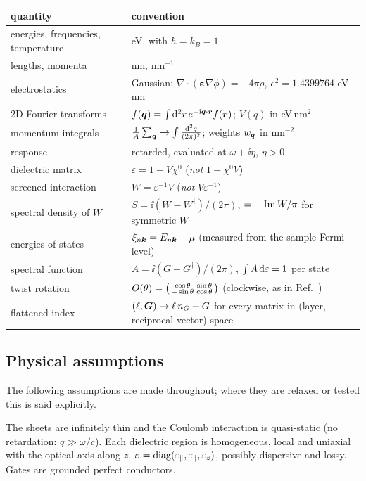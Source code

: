 \begin{center}
\begin{tabularx}{\textwidth}{lX}
\toprule
quantity & convention\\
\midrule
energies, frequencies, temperature & eV, with $\hbar=k_B=1$ \\
lengths, momenta & nm, nm$^{-1}$\\
electrostatics & Gaussian: $\nabla\cdot(\bm\varepsilon\nabla\phi)=-4\pi\rho$, $e^2=1.4399764$ eV\,nm\\
2D Fourier transforms & $f(\bm q)=\int\mathrm d^2r\,e^{-\mathrm i\bm q\cdot\bm r}f(\bm r)$; $V(q)$ in eV\,nm$^2$\\
momentum integrals & $\frac1A\sum_{\bm q}\to\int\frac{\mathrm d^2q}{(2\pi)^2}$; weights $w_{\bm q}$ in nm$^{-2}$\\
response & retarded, evaluated at $\omega+\ii\eta$, $\eta>0$\\
dielectric matrix & $\varepsilon=1-V\chi^0$ \quad(\emph{not} $1-\chi^0V$)\\
screened interaction & $W=\varepsilon^{-1}V$ \quad(\emph{not} $V\varepsilon^{-1}$)\\
spectral density of $W$ & $S=\ii(W-W^\dagger)/(2\pi)$, $=-\operatorname{Im} W/\pi$ for symmetric $W$\\
energies of states & $\xi_{n\bm k}=E_{n\bm k}-\mu$ (measured from the sample Fermi level)\\
spectral function & $A=\ii(G-G^\dagger)/(2\pi)$, $\int A\,\mathrm d\varepsilon=1$ per state\\
twist rotation & $O(\theta)=\begin{psmallmatrix}\cos\theta&\sin\theta\\-\sin\theta&\cos\theta\end{psmallmatrix}$ (clockwise, as in Ref.~\cite{Wei2025})\\
flattened index & $(\ell,\bm G)\mapsto \ell\,n_G+G$ for every matrix in (layer, reciprocal-vector) space\\
\bottomrule
\end{tabularx}
\end{center}

\subsection{Physical assumptions}
\label{sec:assumptions}

The following assumptions are made throughout; where they are relaxed or tested this is said explicitly.

\begin{assumption}[Electrostatics]\label{as:electro}
The sheets are infinitely thin and the Coulomb interaction is quasi-static (no retardation:
$q\gg\omega/c$). Each dielectric region is homogeneous, local and uniaxial with the optical axis along $z$,
$\bm\varepsilon=\operatorname{diag}(\varepsilon_\parallel,\varepsilon_\parallel,\varepsilon_z)$, possibly dispersive and
lossy. Gates are grounded perfect conductors.
\end{assumption}

